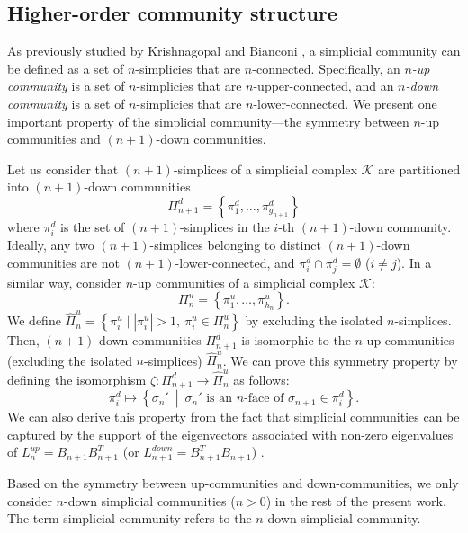\documentclass[10pt, letterpaper]{article}
\begin{document}
\subsection{Higher-order community structure}
As previously studied by Krishnagopal and Bianconi \cite{Krishnagopal2021}, a simplicial community can be defined as a set of $n$-simplicies that are $n$-connected. Specifically, an \textit{$n$-up community} is a set of $n$-simplicies that are $n$-upper-connected, and an \textit{$n$-down community} is a set of $n$-simplicies that are $n$-lower-connected. We present one important property of the simplicial community---the symmetry between $n$-up communities and $(n+1)$-down communities.

Let us consider that $(n+1)$-simplices of a simplicial complex $\mathcal{K}$ are partitioned into $(n+1)$-down communities
\begin{equation}
\Pi_{n+1}^{d}=\left\{\pi_1^d,\ldots,\pi_{g_{n+1}}^{d}\right\}
\end{equation}
where $\pi_i^d$ is the set of $(n+1)$-simplices in the $i$-th $(n+1)$-down community. Ideally, any two $(n+1)$-simplices belonging to distinct $(n+1)$-down communities are not $(n+1)$-lower-connected, and $\pi_i^d \cap \pi_j^d=\emptyset$ ($i\neq j$).
In a similar way, consider $n$-up communities of a simplicial complex $\mathcal{K}$:
\begin{equation}
\Pi_{n}^{u}=\left\{\pi_1^u,\ldots,\pi_{h_{n}}^{u}\right\}.
\end{equation}
We define $\hat{\Pi}_{n}^{u}=\left\{\pi_i^u \mid |\pi_i^u|>1,~\pi_i^u\in\Pi_{n}^{u} \right\}$ by excluding the isolated $n$-simplices.
Then, $(n+1)$-down communities $\Pi_{n+1}^{d}$ is isomorphic to the $n$-up communities (excluding the isolated $n$-simplices) $\hat{\Pi}_{n}^{u}$. We can prove this symmetry property by defining the isomorphism $\zeta: \Pi_{n+1}^{d}\to \hat{\Pi}_{n}^{u}$ as follows:
\begin{equation}
\pi_i^d \mapsto \left\{ \sigma_{n}'~\middle|~\sigma_{n}' \textrm{ is an } n\textrm{-face of } \sigma_{n+1}\in\pi_i^d \right\}.
\end{equation}
We can also derive this property from the fact that simplicial communities can be captured by the support of the eigenvectors associated with non-zero eigenvalues of $L^{up}_{n}=B_{n+1}B_{n+1}^{T}$ (or $L^{down}_{n+1}=B_{n+1}^{T}B_{n+1}$) \cite{Krishnagopal2021}.

Based on the symmetry between up-communities and down-communities, we only consider $n$-down simplicial communities ($n>0$) in the rest of the present work. The term simplicial community refers to the $n$-down simplicial community.
\end{document}

